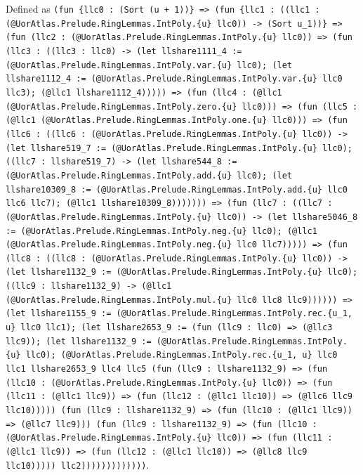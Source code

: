 \documentclass[11pt]{article}
\begin{document}
\noindent Defined as \texttt{(fun \{llc0 : (Sort (u + 1))\} => (fun \{llc1 : ((llc1 : (@UorAtlas.Prelude.RingLemmas.IntPoly.\{u\} llc0)) -> (Sort u\_1))\} => (fun (llc2 : (@UorAtlas.Prelude.RingLemmas.IntPoly.\{u\} llc0)) => (fun (llc3 : ((llc3 : llc0) -> (let llshare1111\_4 := (@UorAtlas.Prelude.RingLemmas.IntPoly.var.\{u\} llc0); (let llshare1112\_4 := (@UorAtlas.Prelude.RingLemmas.IntPoly.var.\{u\} llc0 llc3); (@llc1 llshare1112\_4))))) => (fun (llc4 : (@llc1 (@UorAtlas.Prelude.RingLemmas.IntPoly.zero.\{u\} llc0))) => (fun (llc5 : (@llc1 (@UorAtlas.Prelude.RingLemmas.IntPoly.one.\{u\} llc0))) => (fun (llc6 : ((llc6 : (@UorAtlas.Prelude.RingLemmas.IntPoly.\{u\} llc0)) -> (let llshare519\_7 := (@UorAtlas.Prelude.RingLemmas.IntPoly.\{u\} llc0); ((llc7 : llshare519\_7) -> (let llshare544\_8 := (@UorAtlas.Prelude.RingLemmas.IntPoly.add.\{u\} llc0); (let llshare10309\_8 := (@UorAtlas.Prelude.RingLemmas.IntPoly.add.\{u\} llc0 llc6 llc7); (@llc1 llshare10309\_8))))))) => (fun (llc7 : ((llc7 : (@UorAtlas.Prelude.RingLemmas.IntPoly.\{u\} llc0)) -> (let llshare5046\_8 := (@UorAtlas.Prelude.RingLemmas.IntPoly.neg.\{u\} llc0); (@llc1 (@UorAtlas.Prelude.RingLemmas.IntPoly.neg.\{u\} llc0 llc7))))) => (fun (llc8 : ((llc8 : (@UorAtlas.Prelude.RingLemmas.IntPoly.\{u\} llc0)) -> (let llshare1132\_9 := (@UorAtlas.Prelude.RingLemmas.IntPoly.\{u\} llc0); ((llc9 : llshare1132\_9) -> (@llc1 (@UorAtlas.Prelude.RingLemmas.IntPoly.mul.\{u\} llc0 llc8 llc9)))))) => (let llshare1155\_9 := (@UorAtlas.Prelude.RingLemmas.IntPoly.rec.\{u\_1, u\} llc0 llc1); (let llshare2653\_9 := (fun (llc9 : llc0) => (@llc3 llc9)); (let llshare1132\_9 := (@UorAtlas.Prelude.RingLemmas.IntPoly.\{u\} llc0); (@UorAtlas.Prelude.RingLemmas.IntPoly.rec.\{u\_1, u\} llc0 llc1 llshare2653\_9 llc4 llc5 (fun (llc9 : llshare1132\_9) => (fun (llc10 : (@UorAtlas.Prelude.RingLemmas.IntPoly.\{u\} llc0)) => (fun (llc11 : (@llc1 llc9)) => (fun (llc12 : (@llc1 llc10)) => (@llc6 llc9 llc10))))) (fun (llc9 : llshare1132\_9) => (fun (llc10 : (@llc1 llc9)) => (@llc7 llc9))) (fun (llc9 : llshare1132\_9) => (fun (llc10 : (@UorAtlas.Prelude.RingLemmas.IntPoly.\{u\} llc0)) => (fun (llc11 : (@llc1 llc9)) => (fun (llc12 : (@llc1 llc10)) => (@llc8 llc9 llc10))))) llc2)))))))))))))}.\par
\end{document}
